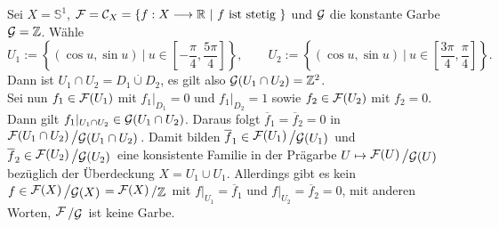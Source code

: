 \documentclass[11pt]{book}
\theoremstyle{nonumberbreak}
\newenvironment{ex}[1][]{\ifthenelse{\equal{#1}{}}{\example}{\example[#1]}\rm}{\endexample}
\newcommand{\slant}[2]{{\raisebox{.1em}{$#1$}\left/\raisebox{-.1em}{$#2$}\right.}}
\begin{document}
\begin{spacing}{1.4}
\begin{ex} 
Sei $X= \mathbb{S}^1$, $\mathcal{F} = \mathcal{C}_X = \{f: X \longrightarrow \mathbb{R} \ \vert \ f \textrm{ ist stetig } \}$ und $\mathcal{G}$ die konstante Garbe $\mathcal{G}= \mathbb{Z}$. Wähle
$$U_1:= \left\{ \left( \cos u, \sin u\right) \ \big\vert \ u \in \left[- \frac{\pi}{4}, \frac{5 \pi}{4} \right] \right\}, \qquad U_2:= \left\{ \left( \cos u, \sin u\right) \ \big\vert \ u \in \left[\frac{3\pi}{4}, \frac{ \pi}{4} \right] \right\}.$$
Dann ist $U_1 \cap U_2= D_1 \overset{.}{\cup} D_2$, es gilt also $\mathcal{G}(U_1 \cap U_2) = \mathbb{Z}^2$.\\
Sei nun $f_1 \in \mathcal{F}(U_1)$ mit $f_1 \vert_{D_1} = 0$ und $f_1 \vert_{D_2} = 1$ sowie $f_2 \in \mathcal{F}(U_2)$ mit $f_2 = 0$. Dann gilt $f_1 \vert_{U_1 \cap U_2} \in \mathcal{G} ( U_1 \cap U_2)$. Daraus folgt $\overline{f}_1 = \overline{f}_2 = 0$ in $\slant{\F(U_1 \cap U_2)}{\G(U_1 \cap U_2)}$.
Damit bilden $\overline{f}_1 \in \slant{\F(U_1)}{\G(U_1)}$ und $\overline{f}_2 \in \slant{\F(U_2)}{\G(U_2)}$ eine konsistente Familie in der Prägarbe $U \mapsto \slant{\F(U)}{\G(U)}$ bezüglich der Überdeckung $X=U_1 \cup U_1$. 
Allerdings gibt es kein $f \in \slant{\F(X)}{\G(X)}= \slant{\F(X)}{\mathbb{Z}}$ mit $f \vert_{U_1} = \overline{f}_1$ und $f \vert_{U_2} = \overline{f}_2 = 0$, mit anderen Worten, $\slant{\F}{\G}$ ist keine Garbe.
\end{ex}

\newcommand{\abgrup}{\underline{\mathrm{Ab}}}
\newcommand{\garben}{\underline{\mathrm{Sh}}}




\end{spacing}
\end{document}
